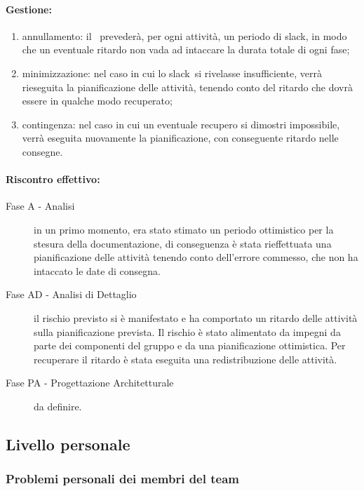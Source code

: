 \documentclass[../PianoProgetto.tex]{subfiles}
\begin{document}
	\paragraph*{Gestione:}
	\begin{enumerate}
		\item annullamento: il \responsabilediprogetto\ prevederà, per ogni attività, un periodo di slack\g, in modo che un eventuale ritardo non vada ad intaccare la durata totale di ogni fase\g ;
		\item minimizzazione: nel caso in cui lo slack\g\ si rivelasse insufficiente, verrà rieseguita la pianificazione delle attività, tenendo conto del ritardo che dovrà essere in qualche modo recuperato;
		\item contingenza: nel caso in cui un eventuale recupero si dimostri impossibile, verrà eseguita nuovamente la pianificazione, con conseguente ritardo nelle consegne.
	\end{enumerate}	
	
	\paragraph*{Riscontro effettivo:} 
		\begin{description}
			\item[Fase A - Analisi] in un primo momento, era stato stimato un periodo ottimistico per la stesura della documentazione, di conseguenza è stata rieffettuata una pianificazione delle attività tenendo conto dell'errore commesso, che non ha intaccato le date di consegna.
			\item[Fase AD - Analisi di Dettaglio] il rischio previsto si è manifestato e ha comportato un ritardo delle attività sulla pianificazione prevista. Il rischio è stato alimentato da impegni da parte dei componenti del gruppo e da una pianificazione ottimistica. Per recuperare il ritardo è stata eseguita una redistribuzione delle attività.
			\item[Fase PA - Progettazione Architetturale] da definire.
		\end{description}
		

\newpage
\subsection{Livello personale}

\subsubsection{Problemi personali dei membri del team}
\label{sec:Problemi personali dei membri del team}
\end{document}
